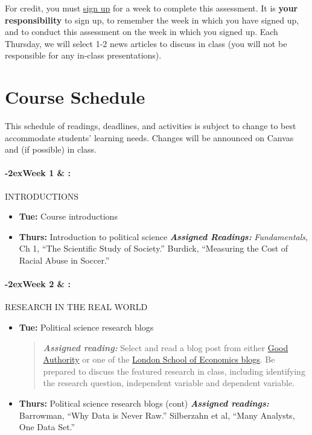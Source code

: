 \documentclass[11pt]{article}
\newcommand{\week}[1]{

  \paragraph*{\kern-2ex\quad #1 \AdvanceDate[1]\syldate{\today} \& \AdvanceDate[2]\syldate{\today} :}

  \ifdim\wd1=\wd\MONDAY
    \AdvanceDate[7]
  \else
    \AdvanceDate[7]
  \fi
}
\begin{document}
\noindent For credit, you must \href{https://docs.google.com/spreadsheets/d/1P3zJhC_YnlgaPTIIq_IjHzhG7TpTGRIutR2eOhizBgY/edit?usp=sharing}{sign up} for a week to complete this assessment. It is \textbf{your responsibility} to sign up, to remember the week in which you have signed up, and to conduct this assessment on the week in which you signed up. Each Thursday, we will select 1-2 news articles to discuss in class (you will not be responsible for any in-class presentations).\\

\clearpage

\clearpage

\newpage
\section*{Course Schedule}
\SetDate[11/08/2025]

This schedule of readings, deadlines, and activities is subject to change to best accommodate students' learning needs. Changes will be announced on Canvas and (if possible) in class.

\week{Week 1} INTRODUCTIONS

\begin{itemize}
    \item [] \textbf{Tue:} Course introductions
    \item [] \textbf{Thurs:} Introduction to political science
    \subitem \textbf{\textit{Assigned Readings:}}
    \subsubitem \textit{Fundamentals}, Ch 1, ``The Scientific Study of Society.''
    \subsubitem Burdick, ``Measuring the Cost of Racial Abuse in Soccer.''
\end{itemize}

\week{Week 2} RESEARCH IN THE REAL WORLD

\begin{itemize}
    \item [] \textbf{Tue:} Political science research blogs
\begin{quotation}\noindent \textbf{\textit{Assigned reading:}} Select and read a blog post from either \href{https://goodauthority.org/}{Good Authority}
or one of the \href{https://blogs.lse.ac.uk/lse-research-blogs/}{London School of Economics blogs}. Be prepared to discuss the featured research in class, including identifying the research question, independent variable and dependent variable.  \end{quotation}

    \item []\textbf{Thurs:} Political science research blogs (cont)
        \subitem \textbf{\textit{Assigned readings:}}
        \subsubitem Barrowman, ``Why Data is Never Raw.''
        \subsubitem Silberzahn et al, ``Many Analysts, One Data Set.''
\end{itemize}
\end{document}
